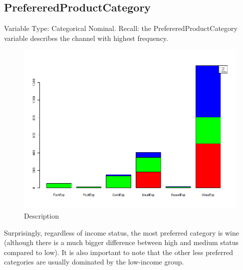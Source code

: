 \subsection{PrefereredProductCategory}
Variable Type: Categorical Nominal.\newline
Recall: the PrefereredProductCategory variable describes the channel with highest frequency.
\begin{figure}[H]
    \centering
    \includegraphics[width=0.8\linewidth]{Imatges/stacked_barplot_counts_IncomeSegment_10_legend(category).png}
    \caption{Description }
    \label{fig:scree_plot}
\end{figure}
\newline
Surprisingly, regardless of income status, the most preferred category is wine (although there is a much bigger difference between high and medium status compared to low). It is also important to note that the other less preferred categories are usually dominated by the low-income group.

